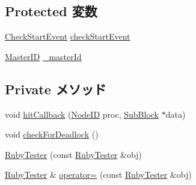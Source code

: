 \subsection*{Protected 変数}
\begin{DoxyCompactItemize}
\item 
\hyperlink{classRubyTester_1_1CheckStartEvent}{CheckStartEvent} \hyperlink{classRubyTester_a9975e990a9801088084cd2d769a8039e}{checkStartEvent}
\item 
\hyperlink{request_8hh_ac366b729262fd8e7cbd3283da6f775cf}{MasterID} \hyperlink{classRubyTester_a23e4e74239f2919fd2f05d672fbf7cb7}{\_\-masterId}
\end{DoxyCompactItemize}
\subsection*{Private メソッド}
\begin{DoxyCompactItemize}
\item 
void \hyperlink{classRubyTester_a8b71a10b528265ae6a63c53c28360d60}{hitCallback} (\hyperlink{TypeDefines_8hh_a83c14b4ae37e80071f6b3506a6c46151}{NodeID} proc, \hyperlink{classSubBlock}{SubBlock} $\ast$data)
\item 
void \hyperlink{classRubyTester_a514b854b1aebca4ab64690855d9588b9}{checkForDeadlock} ()
\item 
\hyperlink{classRubyTester_a48ff36f9d0f5c4edd6ef8231861867d6}{RubyTester} (const \hyperlink{classRubyTester_1_1RubyTester}{RubyTester} \&obj)
\item 
\hyperlink{classRubyTester_1_1RubyTester}{RubyTester} \& \hyperlink{classRubyTester_a71d9335b80022b21a3a95907e238efe6}{operator=} (const \hyperlink{classRubyTester_1_1RubyTester}{RubyTester} \&obj)
\end{DoxyCompactItemize}
